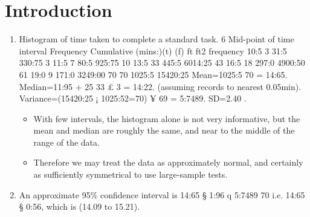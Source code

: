 \documentclass{article}
\begin{document}
\section{Introduction}
\begin{enumerate}


\item Histogram of time taken to complete a standard task.
6
Mid-point of
time interval Frequency Cumulative
(mins:)(t) (f) ft ft2 frequency
10:5 3 31:5 330:75 3
11:5 7 80:5 925:75 10
13:5 33 445:5 6014:25 43
16:5 18 297:0 4900:50 61
19:0 9 171:0 3249:00 70
70 1025:5 15420:25
Mean=1025:5
70 = 14:65.
Median=11:95 + 25
33 £ 3 = 14:22.
(assuming records to nearest 0.05min).
Variance=(15420:25 ¡ 1025:52=70) ¥ 69 = 5:7489. SD=2.40 .
\begin{itemize}
    \item With few intervals, the histogram alone is not very informative, but the mean and median are
roughly the same, and near to the middle of the range of the data. \item Therefore we may treat the
data as approximately normal, and certainly as sufficiently symmetrical to use large-sample tests.
\end{itemize}
\item An approximate 95\% confidence interval is 14:65 § 1:96
q
5:7489
70 i.e. 14:65 § 0:56, which is
(14.09 to 15.21).
\end{enumerate}
\end{document}
